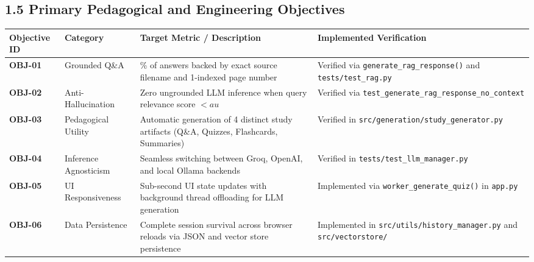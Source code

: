 \documentclass[
]{article}
\begin{document}
\subsection{1.5 Primary Pedagogical and Engineering
Objectives}\label{primary-pedagogical-and-engineering-objectives}

\begingroup\footnotesize
\begin{longtable}[]{@{}
  >{\raggedright\arraybackslash\sloppy}p{}
  >{\raggedright\arraybackslash\sloppy}p{}
  >{\raggedright\arraybackslash\sloppy}p{}
  >{\raggedright\arraybackslash\sloppy}p{}@{}}
\toprule\noalign{}
\begin{minipage}[b]{\linewidth}\raggedright
Objective ID
\end{minipage} & \begin{minipage}[b]{\linewidth}\raggedright
Category
\end{minipage} & \begin{minipage}[b]{\linewidth}\raggedright
Target Metric / Description
\end{minipage} & \begin{minipage}[b]{\linewidth}\raggedright
Implemented Verification
\end{minipage} \\
\midrule\noalign{}
\endhead
\bottomrule\noalign{}
\endlastfoot
\textbf{OBJ-01} & Grounded Q\&A & 100\% of answers backed by exact
source filename and 1-indexed page number & Verified via
\texttt{generate\_\allowbreak rag\_\allowbreak response(\allowbreak )\allowbreak } and \texttt{tests/\allowbreak test\_\allowbreak rag.\allowbreak py} \\
\textbf{OBJ-02} & Anti-Hallucination & Zero ungrounded LLM inference
when query relevance score \(<     au\) & Verified via
\texttt{test\_\allowbreak generate\_\allowbreak rag\_\allowbreak response\_\allowbreak no\_\allowbreak context} \\
\textbf{OBJ-03} & Pedagogical Utility & Automatic generation of 4
distinct study artifacts (Q\&A, Quizzes, Flashcards, Summaries) &
Verified in \texttt{src/\allowbreak generation/\allowbreak study\_\allowbreak generator.\allowbreak py} \\
\textbf{OBJ-04} & Inference Agnosticism & Seamless switching between
Groq, OpenAI, and local Ollama backends & Verified in
\texttt{tests/\allowbreak test\_\allowbreak llm\_\allowbreak manager.\allowbreak py} \\
\textbf{OBJ-05} & UI Responsiveness & Sub-second UI state updates with
background thread offloading for LLM generation & Implemented via
\texttt{worker\_\allowbreak generate\_\allowbreak quiz(\allowbreak )\allowbreak } in \texttt{app.\allowbreak py} \\
\textbf{OBJ-06} & Data Persistence & Complete session survival across
browser reloads via JSON and vector store persistence & Implemented in
\texttt{src/\allowbreak utils/\allowbreak history\_\allowbreak manager.\allowbreak py} and \texttt{src/\allowbreak vectorstore/\allowbreak } \\
\end{longtable}
\endgroup
\end{document}
